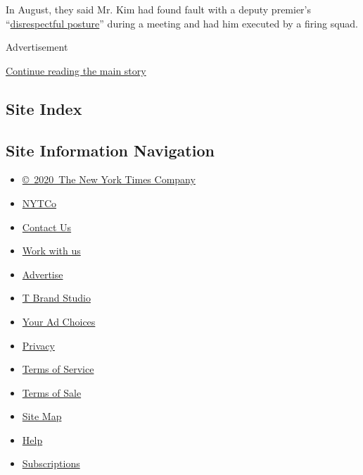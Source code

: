In August, they said Mr. Kim had found fault with a deputy premier's
``\href{https://www.nytimes3xbfgragh.onion/2016/09/01/world/asia/north-korea-executes-deputy-premier.html?_r=0}{disrespectful
posture}'' during a meeting and had him executed by a firing squad.

Advertisement

\protect\hyperlink{after-bottom}{Continue reading the main story}

\hypertarget{site-index}{%
\subsection{Site Index}\label{site-index}}

\hypertarget{site-information-navigation}{%
\subsection{Site Information
Navigation}\label{site-information-navigation}}

\begin{itemize}
\tightlist
\item
  \href{https://help.nytimes3xbfgragh.onion/hc/en-us/articles/115014792127-Copyright-notice}{©~2020~The
  New York Times Company}
\end{itemize}

\begin{itemize}
\tightlist
\item
  \href{https://www.nytco.com/}{NYTCo}
\item
  \href{https://help.nytimes3xbfgragh.onion/hc/en-us/articles/115015385887-Contact-Us}{Contact
  Us}
\item
  \href{https://www.nytco.com/careers/}{Work with us}
\item
  \href{https://nytmediakit.com/}{Advertise}
\item
  \href{http://www.tbrandstudio.com/}{T Brand Studio}
\item
  \href{https://www.nytimes3xbfgragh.onion/privacy/cookie-policy\#how-do-i-manage-trackers}{Your
  Ad Choices}
\item
  \href{https://www.nytimes3xbfgragh.onion/privacy}{Privacy}
\item
  \href{https://help.nytimes3xbfgragh.onion/hc/en-us/articles/115014893428-Terms-of-service}{Terms
  of Service}
\item
  \href{https://help.nytimes3xbfgragh.onion/hc/en-us/articles/115014893968-Terms-of-sale}{Terms
  of Sale}
\item
  \href{https://spiderbites.nytimes3xbfgragh.onion}{Site Map}
\item
  \href{https://help.nytimes3xbfgragh.onion/hc/en-us}{Help}
\item
  \href{https://www.nytimes3xbfgragh.onion/subscription?campaignId=37WXW}{Subscriptions}
\end{itemize}
